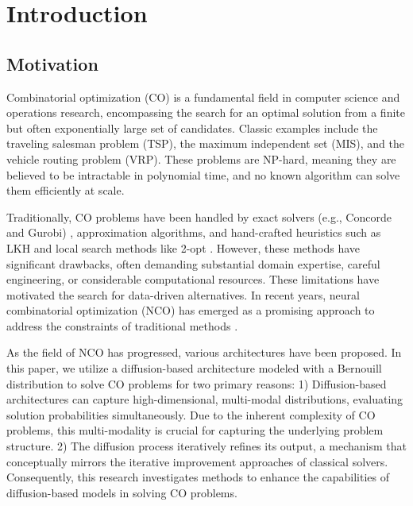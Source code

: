 \chapter{Introduction}
\label{ch:introduction}

\section{Motivation}
\label{sec:motivation}
Combinatorial optimization (CO) is a fundamental field in computer science and operations research,
encompassing the search for an optimal solution from a finite but often exponentially large set of
candidates. Classic examples include the traveling salesman problem (TSP), the maximum independent set (MIS),
and the vehicle routing problem (VRP). These problems are NP-hard, meaning they are believed to be
intractable in polynomial time, and no known algorithm can solve them efficiently at scale.

Traditionally, CO problems have been handled by exact solvers (e.g., Concorde and Gurobi)
\citep{applegate2006traveling,gurobi2023}, approximation algorithms, and hand-crafted heuristics
such as LKH and local search methods like 2-opt
\citep{helsgaun2017extension,croes1958method,lin1973effective}.
However, these methods have significant drawbacks, often demanding substantial domain expertise,
careful engineering, or considerable computational resources. These limitations have motivated the
search for data-driven alternatives. In recent years, neural combinatorial optimization (NCO) has emerged
as a promising approach to address the constraints of traditional methods
\citep{bello2017neural}.

As the field of NCO has progressed, various architectures have been proposed. In this paper,
we utilize a diffusion-based architecture modeled with a Bernouill distribution to solve CO
problems for two primary reasons: 1) Diffusion-based architectures can capture high-dimensional,
multi-modal distributions, evaluating solution probabilities simultaneously. Due to the inherent
complexity of CO problems, this multi-modality is crucial for capturing the underlying problem structure.
2) The diffusion process iteratively refines its output, a mechanism that conceptually mirrors
the iterative improvement approaches of classical solvers. Consequently, this research investigates
methods to enhance the capabilities of diffusion-based models in solving CO problems.

